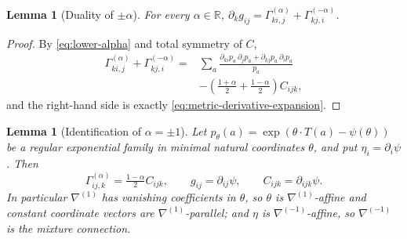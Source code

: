 \documentclass[11pt]{article}
\newtheorem{lemma}[theorem]{Lemma}
\theoremstyle{definition}
\theoremstyle{remark}
\newcommand{\R}{\mathbb{R}}
\begin{document}
\begin{lemma}[Duality of $\pm\alpha$]\label{lem:alpha-duality}
For every $\alpha\in\R$,
$\partial_kg_{ij}=\Gamma^{(\alpha)}_{ki,j}+\Gamma^{(-\alpha)}_{kj,i}$.
\end{lemma}

\begin{proof}
By \eqref{eq:lower-alpha} and total symmetry of $C$,
\begin{equation}
\begin{split}
    \Gamma^{(\alpha)}_{ki,j}+\Gamma^{(-\alpha)}_{kj,i}
    ={}&\sum_a\frac{\partial_{ki}p_a\,\partial_jp_a
        +\partial_{kj}p_a\,\partial_ip_a}{p_a}\\
      &-\left(\tfrac{1+\alpha}{2}+\tfrac{1-\alpha}{2}\right)C_{ijk},
\end{split}
\end{equation}
and the right-hand side is exactly
\eqref{eq:metric-derivative-expansion}.
\end{proof}

\begin{lemma}[Identification of $\alpha=\pm1$]\label{lem:alpha-identification}
Let $p_\theta(a)=\exp(\theta\cdot T(a)-\psi(\theta))$ be a regular exponential
family in minimal natural coordinates $\theta$, and put
$\eta_i=\partial_i\psi$. Then
\begin{equation}
    \Gamma^{(\alpha)}_{ij,k}=\tfrac{1-\alpha}{2}C_{ijk},
    \qquad
    g_{ij}=\partial_{ij}\psi,
    \qquad
    C_{ijk}=\partial_{ijk}\psi .
    \label{eq:exponential-family-alpha}
\end{equation}
In particular $\nabla^{(1)}$ has vanishing coefficients in $\theta$, so
$\theta$ is $\nabla^{(1)}$-affine and constant coordinate vectors are
$\nabla^{(1)}$-parallel; and $\eta$ is $\nabla^{(-1)}$-affine, so
$\nabla^{(-1)}$ is the mixture connection.
\end{lemma}
\end{document}
